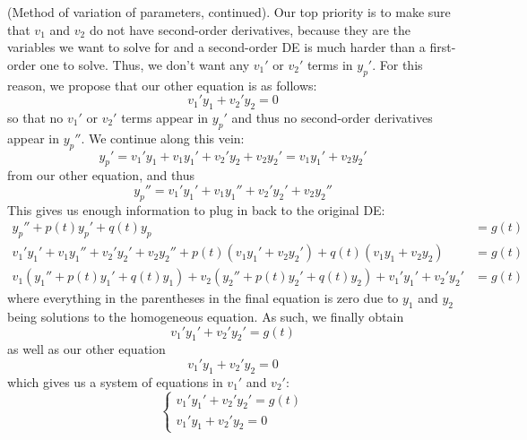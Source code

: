 \documentclass{article}
\begin{document}
\begin{method}
    (Method of variation of parameters, continued). 
    Our top priority is to make sure that $v_1$ and $v_2$ do not have second-order derivatives, because they are the variables we want to solve for and a second-order DE is much harder than a first-order one to solve. Thus, we don't want any $v_1'$ or $v_2'$ terms in $y_p'$. For this reason, we propose that our other equation is as follows:
    \begin{equation*}
        v_1'y_1 + v_2'y_2 = 0
    \end{equation*}
    so that no $v_1'$ or $v_2'$ terms appear in $y_p'$ and thus no second-order derivatives appear in $y_p''$. We continue along this vein:
    \begin{equation*}
        y_p' = v_1'y_1 + v_1y_1' + v_2'y_2 + v_2y_2' = v_1y_1' + v_2y_2'
    \end{equation*}
    from our other equation, and thus 
    \begin{equation*}
        y_p'' = v_1'y_1' + v_1y_1'' + v_2'y_2' + v_2y_2''
    \end{equation*}
    This gives us enough information to plug in back to the original DE:
    \begin{equation*}
        \begin{aligned}
            y_p'' + p(t)y_p' + q(t)y_p &= g(t) \\
            v_1'y_1' + v_1y_1'' + v_2'y_2' + v_2y_2'' + p(t)(v_1y_1' + v_2y_2') + q(t)(v_1y_1 + v_2y_2) &= g(t) \\
            v_1(y_1'' + p(t)y_1' + q(t)y_1) + v_2(y_2''+p(t)y_2' + q(t)y_2) + v_1'y_1' + v_2'y_2' &= g(t)
        \end{aligned}
    \end{equation*}
    where everything in the parentheses in the final equation is zero due to $y_1$ and $y_2$ being solutions to the homogeneous equation. As such, we finally obtain
    \begin{equation*}
        v_1'y_1' + v_2'y_2' = g(t)
    \end{equation*}
    as well as our other equation
    \begin{equation*}
        v_1'y_1 + v_2'y_2 = 0
    \end{equation*}
    which gives us a system of equations in $v_1'$ and $v_2'$:
    \begin{equation*}
        \begin{cases}
            v_1'y_1' + v_2'y_2' = g(t) \\
            v_1'y_1 + v_2'y_2 = 0
        \end{cases}
    \end{equation*}
\end{method}
\end{document}
